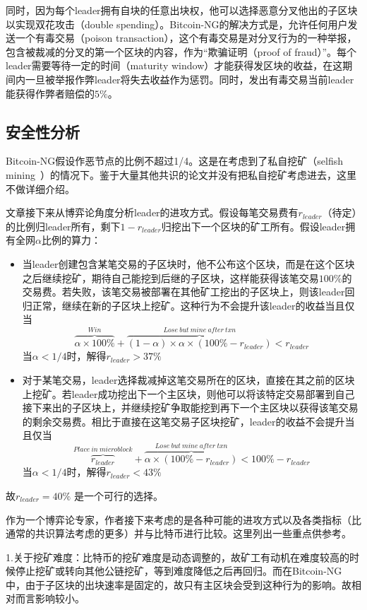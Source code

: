 同时，因为每个leader拥有自块的任意出块权，他可以选择恶意分叉他出的子区块以实现双花攻击（double spending）。Bitcoin-NG的解决方式是，允许任何用户发送一个有毒交易（poison transaction），这个有毒交易是对分叉行为的一种举报，包含被裁减的分叉的第一个区块的内容，作为“欺骗证明（proof of fraud）”。每个leader需要等待一定的时间（maturity window）才能获得发区块的收益，在这期间内一旦被举报作弊leader将失去收益作为惩罚。同时，发出有毒交易当前leader能获得作弊者赔偿的$5\%$。

\subsection{安全性分析}
Bitcoin-NG假设作恶节点的比例不超过1/4。这是在考虑到了私自挖矿（selfish mining~\cite{eyal2018majority}）的情况下。鉴于大量其他共识的论文并没有把私自挖矿考虑进去，这里不做详细介绍。

文章接下来从博弈论角度分析leader的进攻方式。假设每笔交易费有$r_{leader}$（待定）的比例归leader所有，剩下$1-r_{leader}$归挖出下一个区块的矿工所有。假设leader拥有全网$\alpha$比例的算力：
\begin{itemize}
	\item 当leader创建包含某笔交易的子区块时，他不公布这个区块，而是在这个区块之后继续挖矿，期待自己能挖到后继的子区块，这样能获得该笔交易$100\%$的交易费。若失败，该笔交易被部署在其他矿工挖出的子区块上，则该leader回归正常，继续在新的子区块上挖矿。这种行为不会提升该leader的收益当且仅当
	$$ \overbrace{\alpha\times 100\%}^{Win}+\overbrace{(1-\alpha)\times\alpha \times ( 100\%-r_{leader})}^{Lose~but~mine~after~txn}<r_{leader}$$
	当$\alpha<1/4$时，解得$r_{leader} >37\%$
	
	\item 对于某笔交易，leader选择裁减掉这笔交易所在的区块，直接在其之前的区块上挖矿。若leader成功挖出下一个主区块，则他可以将该特定交易部署到自己接下来出的子区块上，并继续挖矿争取能挖到再下一个主区块以获得该笔交易的剩余交易费。相比于直接在这笔交易子区块挖矿，leader的收益不会提升当且仅当
	$$ \overbrace{r_{leader}}^{Place~in~microblock}+\overbrace{ \alpha \times ( 100\%-r_{leader})}^{Lose~but~mine~after~txn} < 100\%-r_{leader}$$
		当$\alpha<1/4$时，解得$r_{leader} < 43\%$
\end{itemize}
故$r_{leader} = 40\%$ 是一个可行的选择。

作为一个博弈论专家，作者接下来考虑的是各种可能的进攻方式以及各类指标（比通常的共识算法考虑的更多）并与比特币进行比较。这里列出一些重点供参考。

1.关于挖矿难度：比特币的挖矿难度是动态调整的，故矿工有动机在难度较高的时候停止挖矿或转向其他公链挖矿，等到难度降低之后再回归。而在Bitcoin-NG中，由于子区块的出块速率是固定的，故只有主区块会受到这种行为的影响。故相对而言影响较小。

